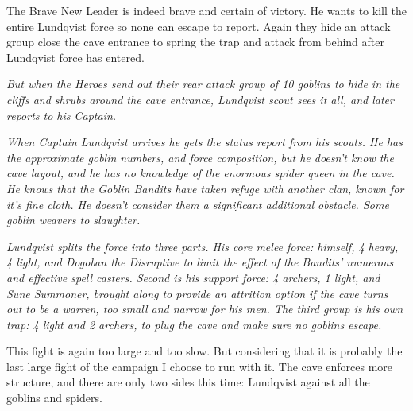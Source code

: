 The Brave New Leader is indeed brave and certain of victory. He wants to kill the entire Lundqvist force so none can escape to report. Again they hide an attack group close the cave entrance to spring the trap and attack from behind after Lundqvist force has entered.

\textit{But when the Heroes send out their rear attack group of 10 goblins to hide in the cliffs and shrubs around the cave entrance, Lundqvist scout sees it all, and later reports to his Captain.}

\textit{When Captain Lundqvist arrives he gets the status report from his scouts. He has the approximate goblin numbers, and force composition, but he doesn't know the cave layout, and he has no knowledge of the enormous spider queen in the cave. He knows that the Goblin Bandits have taken refuge with another clan, known for it's fine cloth. He doesn't consider them a significant additional obstacle. Some goblin weavers to slaughter.}

\textit{Lundqvist splits the force into three parts. His core melee force: himself, 4 heavy, 4 light, and Dogoban the Disruptive to limit the effect of the Bandits' numerous and effective spell casters. Second is his support force: 4 archers, 1 light, and Sune Summoner, brought along to provide an attrition option if the cave turns out to be a warren, too small and narrow for his men. The third group is his own trap: 4 light and 2 archers, to plug the cave and make sure no goblins escape.}



\begin{readoutloud}
This fight is again too large and too slow. But considering that it is probably the last large fight of the campaign I choose to run with it. The cave enforces more structure, and there are only two sides this time: Lundqvist against all the goblins and spiders.
\end{readoutloud}




